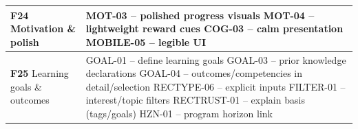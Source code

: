 \begin{longtable}{p{4.5cm} p{10cm}}
\textbf{F24} Motivation \& polish &
MOT-03 -- polished progress visuals \newline
MOT-04 -- lightweight reward cues \newline
COG-03 -- calm presentation \newline
MOBILE-05 -- legible UI \\
\midrule

\textbf{F25} Learning goals \& outcomes &
GOAL-01 -- define learning goals \newline
GOAL-03 -- prior knowledge declarations \newline
GOAL-04 -- outcomes/competencies in detail/selection \newline
RECTYPE-06 -- explicit inputs \newline
FILTER-01 -- interest/topic filters \newline
RECTRUST-01 -- explain basis (tags/goals) \newline
HZN-01 -- program horizon link \\

\end{longtable}